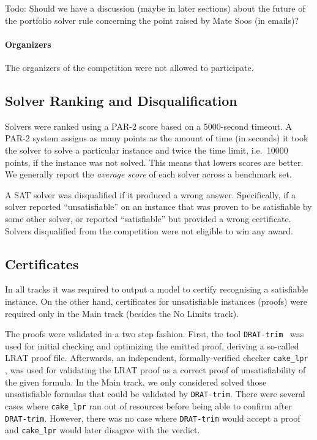 \documentclass{elsarticle}
\newcommand{\todo}[1]{{\color{purple}Todo: #1}}
\begin{document}
\todo{Should we have a discussion (maybe in later sections)
about the future of the portfolio solver rule
concerning the point raised by Mate Soos (in emails)?}

\paragraph{Organizers}
The organizers of the competition were not allowed to participate.

\subsection{Solver Ranking and Disqualification}

Solvers were ranked using a PAR-2 score based on a \num{5000}-second timeout.
A PAR-2 system assigns as many points as the amount of time (in seconds) it took the solver
to solve a particular instance and twice the time limit, i.e.~\num{10000} points,
if the instance was not solved. This means that lowers scores are better.
We generally report the \emph{average score} of each solver across a benchmark set.

A SAT solver was disqualified if it produced a wrong answer. 
Specifically, if a solver reported ``unsatisfiable'' on an instance that 
was proven to be satisfiable by some other solver, or reported ``satisfiable'' 
but provided a wrong certificate. Solvers disqualified from the competition were
not eligible to win any award. 

\subsection{Certificates}

\label{sec:certif}

In all tracks it was required to output a model to certify recognising a satisfiable instance.
On the other hand, certificates for unsatisfiable instances (proofs) were required only 
in the Main track (besides the No Limits track).

The proofs were validated in a two step fashion. First, the tool {\tt DRAT-trim}~\cite{DRATtrim}
was used for initial checking and optimizing the emitted proof, deriving a so-called LRAT proof file.
Afterwards, an independent, formally-verified checker {\tt cake\_lpr} \cite{cakeLprGithub}, 
was used for validating the LRAT proof as a correct proof of unsatisfiability of the given formula.
In the Main track, we only considered solved those unsatisfiable formulas that 
could be validated by {\tt DRAT-trim}.
There were several cases where {\tt cake\_lpr} ran out of resources before being able to 
confirm after {\tt DRAT-trim}. However, there was no case where {\tt DRAT-trim} would accept
a proof and {\tt cake\_lpr} would later disagree with the verdict.
\end{document}

